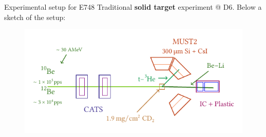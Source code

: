 \documentclass[sans,
frameno, %
mp,
usenames,dvipsnames, %
onlytextwidth, %
t,%
11pt]{beamer}
\begin{document}
\begin{frame}{Experimental setup for E748}
    Traditional \textbf{solid target} experiment @ D6. Below a sketch of the setup:

    \begin{figure}
        \centering
        \includegraphics[width=\linewidth]{figures/setup.pdf}
    \end{figure}
\end{frame}
\end{document}
